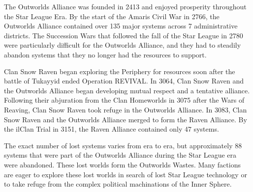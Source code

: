 The Outworlds Alliance was founded in 2413 and enjoyed prosperity throughout the Star League Era.
By the start of the Amaris Civil War in 2766, the Outworlds Alliance contained over 135 major systems across 7 administrative districts.
The Succession Wars that followed the fall of the Star League in 2780 were particularly difficult for the Outworlds Alliance, and they had to steadily abandon systems that they no longer had the resources to support.

Clan Snow Raven began exploring the Periphery for resources soon after the battle of Tukayyid ended Operation REVIVAL.
In 3064, Clan Snow Raven and the Outworlds Alliance began developing mutual respect and a tentative alliance.
Following their abjuration from the Clan Homeworlds in 3075 after the Wars of Reaving, Clan Snow Raven took refuge in the Outworlds Alliance.
In 3083, Clan Snow Raven and the Outworlds Alliance merged to form the Raven Alliance.
By the ilClan Trial in 3151, the Raven Alliance contained only 47 systems.

The exact number of lost systems varies from era to era, but approximately 88 systems that were part of the Outworlds Alliance during the Star League era were abandoned.
These lost worlds form the Outworlds Wastes.
Many factions are eager to explore these lost worlds in search of lost Star League technology or to take refuge from the complex political machinations of the Inner Sphere.
